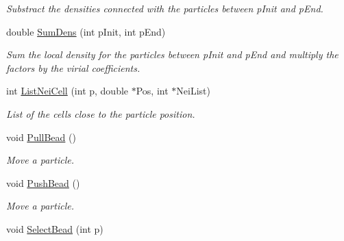 \begin{DoxyCompactItemize}
\begin{DoxyCompactList}\small\item\em \-Substract the densities connected with the particles between p\-Init and p\-End. \end{DoxyCompactList}\item 
\hypertarget{classForces_a0449e9410bf23ad4d073f1eab66c2a68}{double \hyperlink{classForces_a0449e9410bf23ad4d073f1eab66c2a68}{\-Sum\-Dens} (int p\-Init, int p\-End)}\label{classForces_a0449e9410bf23ad4d073f1eab66c2a68}

\begin{DoxyCompactList}\small\item\em \-Sum the local density for the particles between p\-Init and p\-End and multiply the factors by the virial coefficients. \end{DoxyCompactList}\item 
\hypertarget{classForces_a74fa0e6d8f6f25674644320d69e2b8b1}{int \hyperlink{classForces_a74fa0e6d8f6f25674644320d69e2b8b1}{\-List\-Nei\-Cell} (int p, double $\ast$\-Pos, int $\ast$\-Nei\-List)}\label{classForces_a74fa0e6d8f6f25674644320d69e2b8b1}

\begin{DoxyCompactList}\small\item\em \-List of the cells close to the particle position. \end{DoxyCompactList}\item 
\hypertarget{classForces_a6fc6ac99c5e421a12a39ad80e20c9bd6}{void \hyperlink{classForces_a6fc6ac99c5e421a12a39ad80e20c9bd6}{\-Pull\-Bead} ()}\label{classForces_a6fc6ac99c5e421a12a39ad80e20c9bd6}

\begin{DoxyCompactList}\small\item\em \-Move a particle. \end{DoxyCompactList}\item 
\hypertarget{classForces_af92f2e6f00fbbe4093f47b78b91eb2e0}{void \hyperlink{classForces_af92f2e6f00fbbe4093f47b78b91eb2e0}{\-Push\-Bead} ()}\label{classForces_af92f2e6f00fbbe4093f47b78b91eb2e0}

\begin{DoxyCompactList}\small\item\em \-Move a particle. \end{DoxyCompactList}\item 
\hypertarget{classForces_ad4ff146c379b2d2fa7ea219aae0c124e}{void \hyperlink{classForces_ad4ff146c379b2d2fa7ea219aae0c124e}{\-Select\-Bead} (int p)}\label{classForces_ad4ff146c379b2d2fa7ea219aae0c124e}


\end{DoxyCompactItemize}
